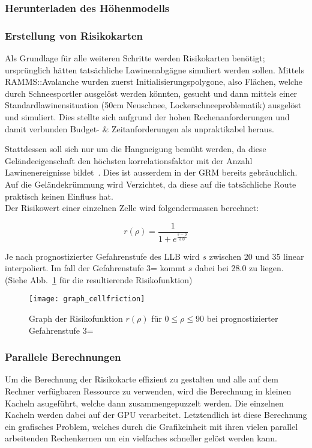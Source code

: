 \subsubsection{Herunterladen des Höhenmodells}


\subsubsection{Erstellung von Risikokarten}

Als Grundlage für alle weiteren Schritte werden Risikokarten benötigt; ursprünglich hätten tatsächliche Lawinenabgägne simuliert werden sollen. Mittels RAMMS::Avalanche wurden zuerst Initialisierungspolygone, also Flächen, welche durch Schneesportler ausgelöst werden könnten, gesucht und dann mittels einer Standardlawinensituation (50cm Neuschnee, Lockerschneeproblematik) ausgelöst und simuliert. Dies stellte sich aufgrund der hohen Rechenanforderungen und damit verbunden Budget- \& Zeitanforderungen als unpraktikabel heraus.

Stattdessen soll sich nur um die Hangneigung bemüht werden, da diese Geländeeigenschaft den höchsten korrelationsfaktor mit der Anzahl Lawinenereignisse bildet~\cite{arpddatasetdocs}. Dies ist ausserdem in der GRM bereits gebräuchlich. Auf die Geländekrümmung wird Verzichtet, da diese auf die tatsächliche Route praktisch keinen Einfluss hat.\\
Der Risikowert einer einzelnen Zelle wird folgendermassen berechnet:

\[
r(\rho) = \frac{1}{1 + e^{\frac{s-\rho}{3.0}}}
\]

Je nach prognostizierter Gefahrenstufe des LLB wird $s$ zwischen 20 und 35 linear interpoliert. Im fall der Gefahrenstufe 3= kommt $s$ dabei bei 28.0 zu liegen. (Siehe Abb.~\ref{fig:graph} für die resultierende Risikofunktion)

\begin{figure}[H]
  \centering
  \texttt{[image: graph\_cellfriction]}
  \caption{Graph der Risikofunktion $r(\rho)$ für $0 \leq \rho \leq 90$ bei prognostizierter Gefahrenstufe 3=}\label{fig:graph}
\end{figure}

\subsubsection{Parallele Berechnungen}

Um die Berechnung der Risikokarte effizient zu gestalten und alle auf dem Rechner verfügbaren Ressource zu verwenden, wird die Berechnung in kleinen Kacheln asugeführt, welche dann zusammengepuzzelt werden. Die einzelnen Kacheln werden dabei auf der GPU verarbeitet. Letztendlich ist diese Berechnung ein grafisches Problem, welches durch die Grafikeinheit mit ihren vielen parallel arbeitenden Rechenkernen um ein vielfaches schneller gelöst werden kann.

